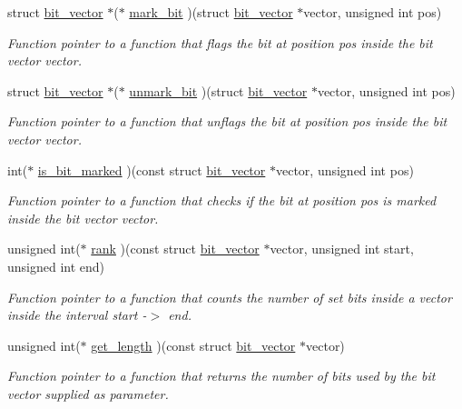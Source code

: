 \begin{DoxyCompactItemize}
\item 
struct \hyperlink{structbit__vector}{bit\-\_\-vector} $\ast$($\ast$ \hyperlink{structbit__vector_afa480cad95d28f925a48ef49a26f83d8}{mark\-\_\-bit} )(struct \hyperlink{structbit__vector}{bit\-\_\-vector} $\ast$vector, unsigned int pos)
\begin{DoxyCompactList}\small\item\em \-Function pointer to a function that flags the bit at position {\ttfamily pos} inside the bit vector {\ttfamily vector}. \end{DoxyCompactList}\item 
struct \hyperlink{structbit__vector}{bit\-\_\-vector} $\ast$($\ast$ \hyperlink{structbit__vector_a63fceb0ab2c93f5d73f71bf156496716}{unmark\-\_\-bit} )(struct \hyperlink{structbit__vector}{bit\-\_\-vector} $\ast$vector, unsigned int pos)
\begin{DoxyCompactList}\small\item\em \-Function pointer to a function that unflags the bit at position {\ttfamily pos} inside the bit vector {\ttfamily vector}. \end{DoxyCompactList}\item 
int($\ast$ \hyperlink{structbit__vector_ad8ffb52bc86612775cdca0d9d02dbf1a}{is\-\_\-bit\-\_\-marked} )(const struct \hyperlink{structbit__vector}{bit\-\_\-vector} $\ast$vector, unsigned int pos)
\begin{DoxyCompactList}\small\item\em \-Function pointer to a function that checks if the bit at position {\ttfamily pos} is marked inside the bit vector {\ttfamily vector}. \end{DoxyCompactList}\item 
unsigned int($\ast$ \hyperlink{structbit__vector_a0cb7e47ff1bfefaf8e2cc0d5b4a361c3}{rank} )(const struct \hyperlink{structbit__vector}{bit\-\_\-vector} $\ast$vector, unsigned int start, unsigned int end)
\begin{DoxyCompactList}\small\item\em \-Function pointer to a function that counts the number of set bits inside a vector inside the interval start -\/$>$ end. \end{DoxyCompactList}\item 
unsigned int($\ast$ \hyperlink{structbit__vector_a4dd635a7181b451d8a708d152202a9f9}{get\-\_\-length} )(const struct \hyperlink{structbit__vector}{bit\-\_\-vector} $\ast$vector)
\begin{DoxyCompactList}\small\item\em \-Function pointer to a function that returns the number of bits used by the bit vector supplied as parameter. \end{DoxyCompactList}\end{DoxyCompactItemize}


